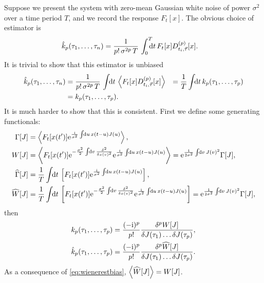 \documentclass[12pt]{article}
\theoremstyle{slplain}
\theoremstyle{sldefinition}
\theoremstyle{remark}
\newcommand{\hz}{\widehat{\Gamma}}
\newcommand{\hw}{\widehat{W}}
\begin{document}
Suppose we present the system with zero-mean Gaussian white noise of power $\sigma^2$ over a time period $T$, and we record the response $F_t[x]$. The obvious choice of estimator is
%
\begin{equation}\label{eq:wienerest}
  \begin{aligned}
    \hat{k}_p(\tau_1,\ldots,\tau_n) &= \frac{1}{p!\,\sigma^{2p}\,T} \, \intd[_0^T\!\!]{t} F_t[x] D\rp{p}_{t_i,\vec{\tau}}[x] .
  \end{aligned}
\end{equation}
%
It is trivial to show that this estimator is unbiased
%
\begin{equation}\label{eq:wienerestbias}
  \begin{aligned}
    \hat{k}_p(\tau_1,\ldots,\tau_n) &= \frac{1}{p!\,\sigma^{2p}\,T} \, \intd{t} \av{F_t[x] D\rp{p}_{t_i,\vec{\tau}}[x]}
      &= \frac{1}{T}\intd{t}k_p(\tau_1,\ldots,\tau_p) \\
      &= k_p(\tau_1,\ldots,\tau_p).
  \end{aligned}
\end{equation}
%
It is much harder to show that this is consistent. First we define some generating functionals:
%
\begin{equation}\label{eq:wienergen}
  \begin{aligned}
    \Gamma[J] &= \av{F_t[x(t')] \e^{\frac{\ir}{\sigma^2} \intd{u} x(t-u)J(u)}},  \\
    W[J] &= \av{F_t[x(t')] \e^{-\frac{\sigma^2}{2} \intd{v}\fdf{^2}{x(v)^2}} \e^{\frac{\ir}{\sigma^2} \intd{u} x(t-u)J(u)}}
     = \e^{\frac{1}{2\sigma^2} \intd{v}J(v)^2} \Gamma[J],  \\
    \hz[J] &= \frac{1}{T}\intd{t} \brk{F_t[x(t')] \e^{\frac{\ir}{\sigma^2} \intd{u} x(t-u)J(u)}},  \\
    \hw[J] &= \frac{1}{T}\intd{t} \brk{F_t[x(t')] \e^{-\frac{\sigma^2}{2} \intd{v}\fdf{^2}{x(v)^2}} \e^{\frac{\ir}{\sigma^2} \intd{u} x(t-u)J(u)}}
     = \e^{\frac{1}{2\sigma^2} \intd{v}J(v)^2} \Gamma[J],
  \end{aligned}
\end{equation}
%
then
%
\begin{equation}\label{eq:wienergendiff}
  \begin{aligned}
     k_p(\tau_1,\ldots,\tau_p) &= \frac{(-\ir)^{p}}{p!} \fdf{^p W[J]}{J(\tau_1)\ldots\delta J(\tau_p)}, \\
     \hat{k}_p(\tau_1,\ldots,\tau_p) &= \frac{(-\ir)^{p}}{p!} \fdf{^p \hw[J]}{J(\tau_1)\ldots\delta J(\tau_p)}.
  \end{aligned}
\end{equation}
%
As a consequence of \eqref{eq:wienerestbias}, $\av{\hw[J]}=W[J]$.
\end{document}
